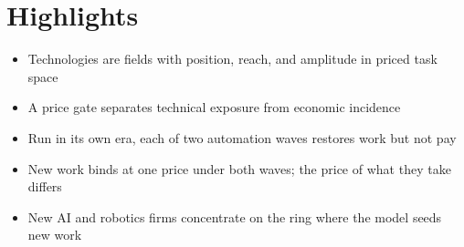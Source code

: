 \documentclass{article}
\begin{document}
\section*{Highlights}
\begin{itemize}
  \item Technologies are fields with position, reach, and amplitude in priced task space
  \item A price gate separates technical exposure from economic incidence
  \item Run in its own era, each of two automation waves restores work but not pay
  \item New work binds at one price under both waves; the price of what they take differs
  \item New AI and robotics firms concentrate on the ring where the model seeds new work
\end{itemize}
\end{document}
